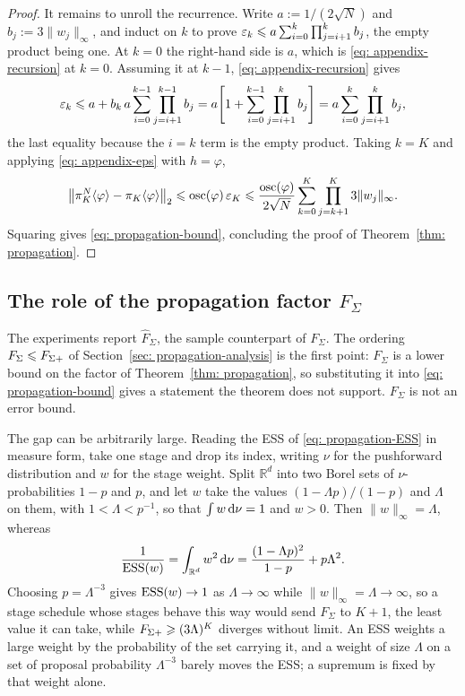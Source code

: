 \documentclass{article}
\begin{document}
\begin{proof}
It remains to unroll the recurrence. Write $a:=1/(2\sqrt N)$ and $b_j:=3\lVert w_j\rVert_\infty$, and induct on $k$ to prove $\varepsilon_k \leqslant a\sum_{i=0}^{k}\prod_{j=i+1}^{k}b_j$, the empty product being one. At $k=0$ the right-hand side is $a$, which is \eqref{eq: appendix-recursion} at $k=0$. Assuming it at $k-1$, \eqref{eq: appendix-recursion} gives
\begin{equation*}
    \varepsilon_k \leqslant a + b_k\,a\sum_{i=0}^{k-1}\prod_{j=i+1}^{k-1}b_j
    = a\Biggl[1+\sum_{i=0}^{k-1}\prod_{j=i+1}^{k}b_j\Biggr]
    = a\sum_{i=0}^{k}\prod_{j=i+1}^{k}b_j ,
\end{equation*}
the last equality because the $i=k$ term is the empty product. Taking $k=K$ and applying \eqref{eq: appendix-eps} with $h=\varphi$,
\begin{equation*}
    \bigl\lVert\pi_K^N\langle \varphi\rangle-\pi_K\langle \varphi\rangle\bigr\rVert_2
    \leqslant \operatorname{osc}(\varphi)\,\varepsilon_K
    \leqslant \frac{\operatorname{osc}(\varphi)}{2\sqrt N}\sum_{k=0}^{K}\prod_{j=k+1}^{K}3\lVert w_j\rVert_\infty .
\end{equation*}
Squaring gives \eqref{eq: propagation-bound}, concluding the proof of Theorem~\ref{thm: propagation}.
\end{proof}

\subsection{The role of the propagation factor \texorpdfstring{$F_\Sigma$}{F-Sigma}}
\label{subsec: appendix-factor}

The experiments report $\hat F_\Sigma$, the sample counterpart of $F_\Sigma$. The ordering $F_\Sigma\leqslant F_{\Sigma+}$ of Section~\ref{sec: propagation-analysis} is the first point: $F_\Sigma$ is a lower bound on the factor of Theorem~\ref{thm: propagation}, so substituting it into \eqref{eq: propagation-bound} gives a statement the theorem does not support. $F_\Sigma$ is not an error bound.

The gap can be arbitrarily large. Reading the ESS of \eqref{eq: propagation-ESS} in measure form, take one stage and drop its index, writing $\nu$ for the pushforward distribution and $w$ for the stage weight. Split $\mathbb R^d$ into two Borel sets of $\nu$-probabilities $1-p$ and $p$, and let $w$ take the values $(1-\Lambda p)/(1-p)$ and $\Lambda$ on them, with $1<\Lambda<p^{-1}$, so that $\int w\,\mathrm{d}\nu=1$ and $w>0$. Then $\lVert w\rVert_\infty=\Lambda$, whereas
\begin{equation}
    \frac{1}{\mathrm{ESS}(w)} = \int_{\mathbb R^d} w^2\,\mathrm{d}\nu = \frac{(1-\Lambda p)^{2}}{1-p} + p\Lambda^{2} .
    \label{eq: appendix-twopoint}
\end{equation}
Choosing $p=\Lambda^{-3}$ gives $\mathrm{ESS}(w)\to1$ as $\Lambda\to\infty$ while $\lVert w\rVert_\infty=\Lambda\to\infty$, so a stage schedule whose stages behave this way would send $F_\Sigma$ to $K+1$, the least value it can take, while $F_{\Sigma+}\geqslant(3\Lambda)^{K}$ diverges without limit. An ESS weights a large weight by the probability of the set carrying it, and a weight of size $\Lambda$ on a set of proposal probability $\Lambda^{-3}$ barely moves the ESS; a supremum is fixed by that weight alone.
\end{document}
